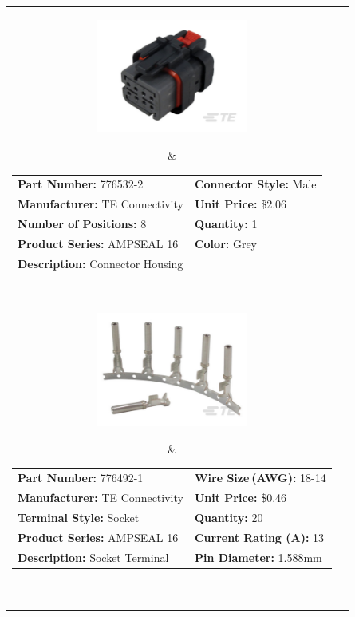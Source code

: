 \documentclass[12pt,letterpaper]{article}
\begin{document}
\begin{longtable}{c l}
\parbox[c]{5cm}{\includegraphics[width=5cm]{776532-2.png} }
& \begin{tabular}{l l}
\textbf{Part Number:} 776532-2 & \textbf{Connector Style:} Male \\
\textbf{Manufacturer:} TE Connectivity & \textbf{Unit Price:} \$2.06 \\
\textbf{Number of Positions:} 8 & \textbf{Quantity:} 1 \\
\textbf{Product Series:} AMPSEAL 16 & \textbf{Color:} Grey \\
\multicolumn{2}{p{8cm}}{\textbf{Description:} Connector Housing } \\
\end{tabular} \\

\parbox[c]{5cm}{\includegraphics[width=5cm]{776492-1.png} }
& \begin{tabular}{l l}
\textbf{Part Number:} 776492-1 & \textbf{Wire Size (AWG):} 18-14 \\
\textbf{Manufacturer:} TE Connectivity & \textbf{Unit Price:} \$0.46 \\
\textbf{Terminal Style:} Socket & \textbf{Quantity:} 20 \\
\textbf{Product Series:} AMPSEAL 16 & \textbf{Current Rating (A):} 13 \\
\textbf{Description:} Socket Terminal  & \textbf{Pin Diameter:} 1.588\si{\milli\meter} \\
\end{tabular} \\


\end{longtable}
\end{document}
